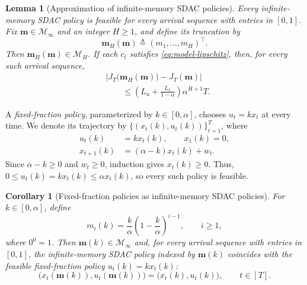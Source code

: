 \documentclass[journal]{IEEEtran}
\newtheorem{lemma}{Lemma}
\newtheorem{corollary}{Corollary}
\theoremstyle{remark}
\begin{document}
\begin{lemma}[Approximation of infinite-memory SDAC policies]
\label{lem:sdac-truncation-approx}
Every infinite-memory SDAC policy is feasible for every arrival sequence with
entries in $[0,1]$. Fix $\mathbf{m}\in\mathcal{M}_\infty$ and an integer $H\ge1$,
and define its truncation by
\begin{equation}
\label{eq:def-sdac-truncation}
\mathbf{m}_H(\mathbf{m})\triangleq(m_1,\ldots,m_H)^\top.
\end{equation}
Then $\mathbf{m}_H(\mathbf{m})\in\mathcal{M}_H$. If each $c_t$ satisfies
\eqref{eq:model-lipschitz}, then, for every such arrival sequence,
\begin{equation}
\label{eq:sdac-truncation-cost-gap}
\begin{aligned}
&\left|J_T\bigl(\mathbf{m}_H(\mathbf{m})\bigr)-J_T(\mathbf{m})\right| \\
&\qquad\le
\left(L_u+\frac{L_x}{1-\alpha}\right)\alpha^{H+1}T.
\end{aligned}
\end{equation}
\end{lemma}

A \emph{fixed-fraction policy}, parameterized by $k\in[0,\alpha]$, chooses
$u_t=kx_t$ at every time. We denote its trajectory by
$\{(x_t(k),u_t(k))\}_{t=1}^T$, where
\begin{equation}
\label{eq:def-fraction-trajectory}
\begin{aligned}
u_t(k)&=kx_t(k),\qquad x_1(k)=0,\\
x_{t+1}(k)&=(\alpha-k)x_t(k)+w_t.
\end{aligned}
\end{equation}
Since $\alpha-k\ge0$ and $w_t\ge0$, induction gives $x_t(k)\ge0$.
Thus, $0\le u_t(k)=kx_t(k)\le\alpha x_t(k)$, so every such policy is feasible.

\begin{corollary}[Fixed-fraction policies as infinite-memory SDAC policies]
\label{cor:fraction-as-sdac}
For $k\in[0,\alpha]$, define
\begin{equation}
\label{eq:def-fraction-parameter}
m_i(k)=\frac{k}{\alpha}\left(1-\frac{k}{\alpha}\right)^{i-1},
\qquad i\ge1,
\end{equation}
where $0^0=1$.
Then $\mathbf{m}(k)\in\mathcal{M}_\infty$ and, for every arrival sequence with
entries in $[0,1]$, the infinite-memory SDAC policy indexed by $\mathbf{m}(k)$
coincides with the feasible fixed-fraction policy $u_t(k)=kx_t(k)$:
\begin{equation}
\label{eq:fraction-sdac-trajectory}
\bigl(x_t(\mathbf{m}(k)),u_t(\mathbf{m}(k))\bigr)
=\bigl(x_t(k),u_t(k)\bigr),
\qquad t\in[T].
\end{equation}
\end{corollary}
\end{document}
